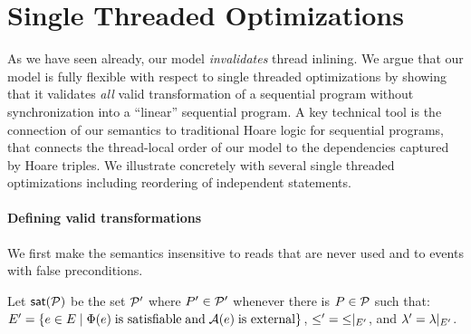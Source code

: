 \newcommand{\aCtxt}{{\mathcal C}}
\newcommand{\aLocReg}{\aLoc_{{loc}}}
\newcommand{\aRead}{\aLoc_{r}}
\newcommand{\aChanged}{\aLoc_{c}}
\newcommand{\linV}[1]{#1_{{\tt lin}}}


\section{Single Threaded Optimizations}
\label{sec:opt}



As we have seen already, our model {\em invalidates} thread inlining.  We argue that our model is fully flexible with respect to single threaded optimizations by showing that it validates {\em all} valid transformation of a sequential program without synchronization into a ``linear'' sequential program.   A key technical tool is the connection of our semantics to traditional Hoare logic for sequential programs, that connects the thread-local order of our model to the dependencies captured by Hoare triples.  We illustrate  concretely with several 
single threaded optimizations including reordering of independent statements.  




\paragraph*{Defining valid transformations}
We first make the semantics insensitive to
reads that are never used and to events with false preconditions.


Let $\mathsf{sat}(\mathcal{P})$ be the set $\mathcal{P}'$ where $P'\in\mathcal{P}'$ whenever
there is $P\in\mathcal{P}$ such that:
$E' = \{e \in E\mid \Phi(e)\;\text{is satisfiable}\;\allowbreak\text{and}\allowbreak\; \mathcal{A}(e)\;\text{is external}\}$,
${\le'} = {\le}\mathbin{|}_{E'}$,
and
${\lambda'} = {\lambda}\mathbin{|}_{E'}$.

